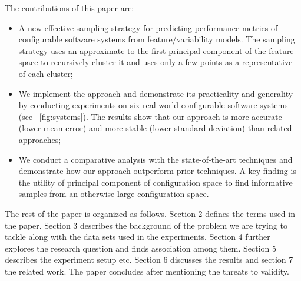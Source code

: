 \documentclass{sig-alternative}
\newcommand{\bi}{\begin{itemize}}%
\newcommand{\ei}{\end{itemize}}
\begin{document}
The contributions of this paper are:
\bi
\item A new effective sampling strategy for predicting performance metrics of configurable software systems from feature/variability models. The sampling strategy uses an approximate to the first principal component of the feature space to recursively cluster it and uses only a few points as a representative of each cluster;
\item We implement the approach and demonstrate its practicality and generality by conducting experiments on six real-world configurable software systems (see ~\ref{fig:systems}). The results show that our approach is more accurate (lower mean error) and more stable (lower standard deviation) than related approaches;
\item We conduct a comparative analysis with the state-of-the-art techniques and demonstrate how our approach outperform prior techniques. A key finding is the utility of principal component of configuration space to  find informative samples from an otherwise large configuration space.
\ei

The rest of the paper is organized as follows. Section 2 defines the terms used in the paper. Section 3 describes the background of the problem we are trying to tackle along with the data sets used in the experiments. Section 4 further explores the research question and finds association among them. Section 5 describes the experiment setup etc. Section 6 discusses the results and section 7 the related work. The paper concludes after mentioning the threats to validity.
\end{document}
